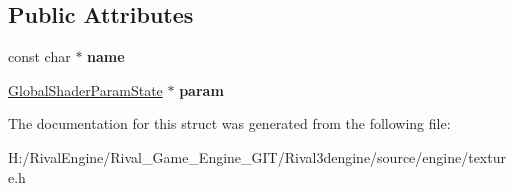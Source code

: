 \subsection*{Public Attributes}
\begin{DoxyCompactItemize}
\item 
\mbox{\label{struct_global_shader_param_a706f596f0d9de0949e3e417ba1522810}} 
const char $\ast$ {\bfseries name}
\item 
\mbox{\label{struct_global_shader_param_a599f7eafcd26c43b4c072afe5dc329b5}} 
\hyperlink{struct_global_shader_param_state}{Global\+Shader\+Param\+State} $\ast$ {\bfseries param}
\end{DoxyCompactItemize}


The documentation for this struct was generated from the following file\+:\begin{DoxyCompactItemize}
\item 
H\+:/\+Rival\+Engine/\+Rival\+\_\+\+Game\+\_\+\+Engine\+\_\+\+G\+I\+T/\+Rival3dengine/source/engine/texture.\+h\end{DoxyCompactItemize}
